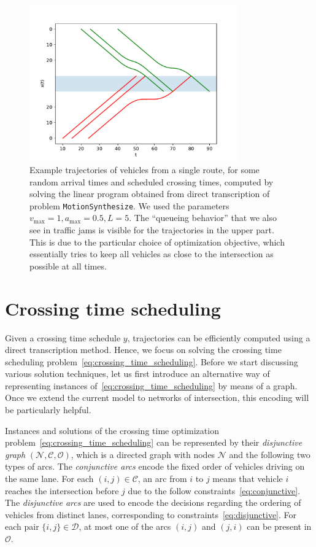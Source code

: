\documentclass[a4paper]{article}
\theoremstyle{definition}
\theoremstyle{plain}
\begin{document}
\begin{figure}
  \centering
  \includegraphics[width=0.8\textwidth]{figures/trajectories_delay.pdf}
  \caption{Example trajectories of vehicles from a single route, for some random
    arrival times and scheduled crossing times, computed by solving the linear
    program obtained from direct transcription of problem \texttt{MotionSynthesize}. We
    used the parameters $v_{\max} = 1, a_{\max} = 0.5, L = 5$. The ``queueing
    behavior'' that we also see in traffic jams is visible for the trajectories
    in the upper part. This is due to the particular choice of optimization
    objective, which essentially tries to keep all vehicles as close to the
    intersection as possible at all times.}
\end{figure}


\section{Crossing time scheduling}

Given a crossing time schedule $y$, trajectories can be efficiently computed
using a direct transcription method. Hence, we focus on solving the crossing
time scheduling problem~\eqref{eq:crossing_time_scheduling}. Before we start
discussing various solution techniques, let us first introduce an alternative
way of representing instances of~\eqref{eq:crossing_time_scheduling} by means of a
graph. Once we extend the current model to networks of intersection, this
encoding will be particularly helpful.

Instances and solutions of the crossing time optimization
problem~\eqref{eq:crossing_time_scheduling} can be represented by
their \textit{disjunctive graph}
$(\mathcal{N}, \mathcal{C}, \mathcal{O})$, which is a directed graph with nodes
$\mathcal{N}$ and the following two types of arcs. The \textit{conjunctive arcs}
encode the fixed order of vehicles driving on the same lane. For each
$(i,j) \in \mathcal{C}$, an arc from $i$ to $j$ means that vehicle $i$ reaches
the intersection before $j$ due to the follow
constraints~\eqref{eq:conjunctive}. The \textit{disjunctive arcs} are used to
encode the decisions regarding the ordering of vehicles from distinct lanes,
corresponding to constraints~\eqref{eq:disjunctive}. For each pair
$\{i,j\} \in \mathcal{D}$, at most one of the arcs $(i,j)$ and $(j,i)$ can be
present in $\mathcal{O}$.
\end{document}
